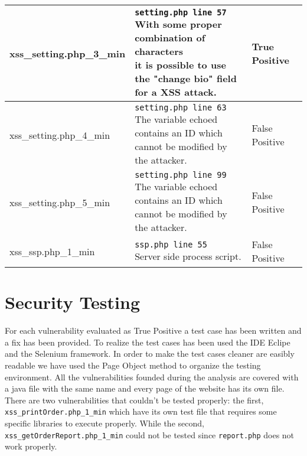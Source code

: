 \documentclass[11pt]{article}
\begin{document}
\begin{longtable}[H]{| p{} | p{} | p{} |}
	 	\hline
	  	xss\_setting.php\_3\_min 	
	  	& \makecell{ \texttt{setting.php line 57} \\
				With some proper combination of characters \\ 
				it is possible to use the "change bio" field \\
				for a XSS attack.}  
	 	& \textbf{True Positive}\\

	 	\hline
	  	xss\_setting.php\_4\_min 	
	  	& \makecell{ \texttt{setting.php line 63} \\
				The variable echoed contains an ID which \\
			 	cannot be modified by the attacker.}  
	 	& False Positive\\

	 	\hline
	  	xss\_setting.php\_5\_min 	
	  	& \makecell{ \texttt{setting.php line 99} \\
				The variable echoed contains an ID which \\
			 	cannot be modified by the attacker.}
	 	& False Positive\\

	 	\hline
	  	xss\_ssp.php\_1\_min 	
	  	& \makecell{ \texttt{ssp.php line 55} \\
				Server side process script.}  
	 	& False Positive\\

	 	\hline


	 	    
\end{longtable}


\section{Security Testing}
For each vulnerability evaluated as True Positive a test case has been written and a fix has been provided. 
To realize the test cases has been used the IDE Eclipe and the Selenium framework. 
In order to make the test cases cleaner are easibly readable we have used the Page Object method to organize the testing environment.
All the vulnerabilities founded during the analysis are covered with a java file with the same name and every page of the website has its own file.
There are two vulnerabilities that couldn't be tested properly: the first, \texttt{xss\_printOrder.php\_1\_min} which have its own test file that requires some specific libraries to execute properly. While the second, \texttt{xss\_getOrderReport.php\_1\_min} could not be tested since \texttt{report.php} does not work properly.
\end{document}
